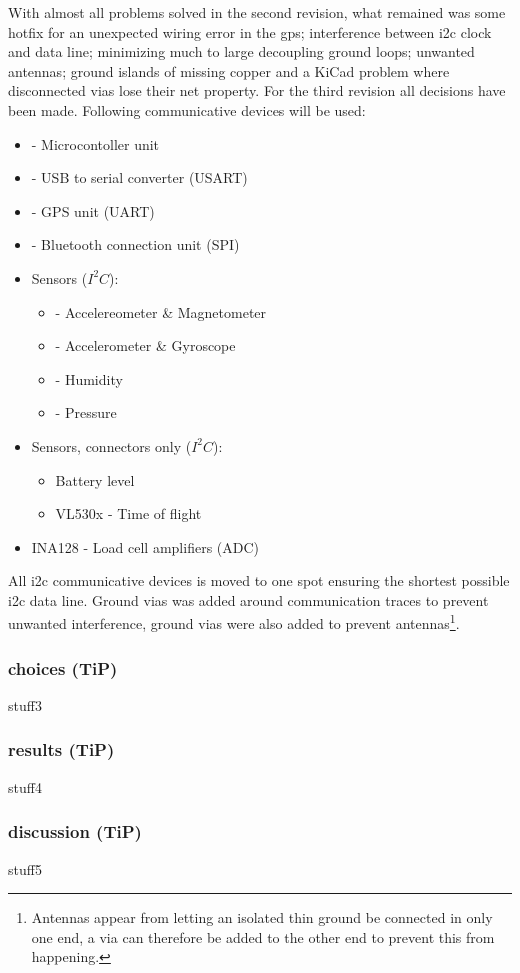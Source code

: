 With almost all problems solved in the second revision, what remained was some hotfix for an unexpected wiring error in the \gls{gps}; interference between \gls{i2c} clock and data line; minimizing much to large decoupling ground loops; unwanted antennas; ground islands of missing copper and  a KiCad problem where disconnected \gls{via}s lose their net property.
For the third revision all decisions have been made. Following communicative devices will be used:
\begin{itemize}
\item{ - Microcontoller unit}
\item{ - USB to serial converter (USART)}
\item{ - GPS unit (UART)}
\item{ - Bluetooth connection unit (SPI)}
\item Sensors ($I^2C$):
	\begin{itemize}
	\item{ - Accelereometer \& Magnetometer}
	\item{ - Accelerometer \& Gyroscope}
	\item{ - Humidity}
	\item{ - Pressure}
	\end{itemize}
\item Sensors, connectors only ($I^2C$):
	\begin{itemize}
	\item Battery level
	\item VL530x \qquad- Time of flight
	\end{itemize}
\item INA128 \qquad- Load cell amplifiers (ADC)
\end{itemize}
All \gls{i2c} communicative devices is moved to one spot ensuring the shortest possible \gls{i2c} data line. Ground \gls{via}s was added around communication traces to prevent unwanted interference, ground \gls{via}s were also added to prevent antennas\footnote{Antennas appear from letting an isolated thin ground be connected in only one end, a \gls{via} can therefore be added to the other end to prevent this from happening.}.

\subsubsection{choices (TiP)}
stuff3

\subsubsection{results (TiP)}
stuff4

\subsubsection{discussion (TiP)}
stuff5